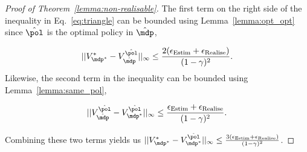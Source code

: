 \begin{proof}[Proof of Theorem~\ref{lemma:non-realisable}]
The first term on the right side of the inequality in Eq.~\ref{eq:triangle} can be bounded using Lemma~\ref{lemma:opt_opt} since $\hat{\pol}$ is the optimal policy in $\hat{\mdp}$,

\begin{equation}
    ||V^{*}_{\mdp^{*}}-V_{\hat{\mdp}}^{\hat{\pol}}||_\infty \leq \frac{2(\epsilon_{\mathrm{Estim}}+\epsilon_{\mathrm{Realise}})}{(1-\gamma)^2}.
\end{equation}
Likewise, the second term in the inequality can be bounded using Lemma~\ref{lemma:same_pol},

\begin{equation}
    ||V_{\hat{\mdp}}^{\hat{\pol}}-V_{\mdp^*}^{\hat{\pol}}||_\infty \leq \frac{\epsilon_{\mathrm{Estim}}+\epsilon_{\mathrm{Realise}}}{(1-\gamma)^2}.
\end{equation}

Combining these two terms yields us $||V_{{\mdp^*}}^{*}-V_{{\mdp^*}}^{\hat{\pol}}||_\infty \leq \frac{3(\epsilon_{\mathrm{Estim}}+\epsilon_{\mathrm{Realise}})}{(1-\gamma)^2}$.
\end{proof}

